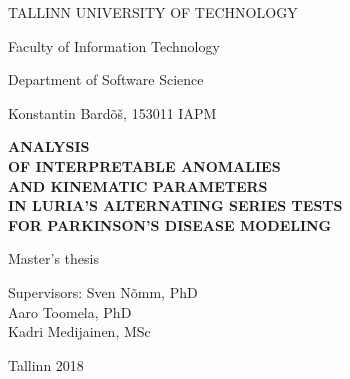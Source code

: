 \begin{titlepage}
    \begin{center}
        \large
        TALLINN UNIVERSITY OF TECHNOLOGY 
        
        Faculty of Information Technology
        
        Department of Software Science
        
        \vspace*{6.5cm}
        
        
         Konstantin Bardõš, 153011 IAPM
        
        \vspace{0.3cm}
        
        \Large
        
        
        
        
        
        \textbf{ANALYSIS \\ OF INTERPRETABLE ANOMALIES 
        \\ AND KINEMATIC PARAMETERS 
        \\ IN LURIA'S ALTERNATING SERIES TESTS
        \\ FOR PARKINSON'S DISEASE MODELING}
        
        \large
        \vspace{0.3cm}
        Master's thesis
        
        \vspace{2cm}
        
        \begin{flushright}
        Supervisors: Sven Nõmm, PhD \\ Aaro Toomela, PhD \\ Kadri Medijainen, MSc
        \end{flushright}
        
        
        \vfill
        

        \vspace{0.8cm}
        
        Tallinn 
        2018
        
    \end{center}
\end{titlepage}